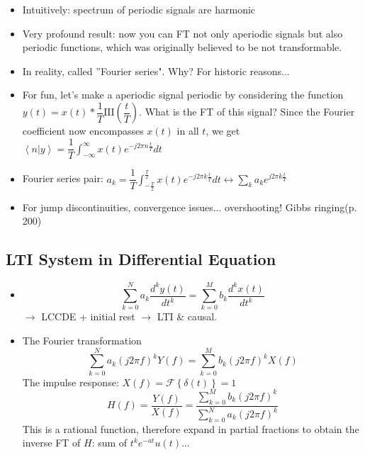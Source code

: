 \documentclass{article}
\begin{document}
\begin{itemize}
    \item Intuitively: spectrum of periodic signals are harmonic
    \item Very profound result: now you can FT not only aperiodic signals but also periodic functions, which was originally believed to be not transformable.
    \item In reality, called ''Fourier series". Why? For historic reasons...
    \item For fun, let's make a aperiodic signal periodic by considering the function $y(t)=x(t)*\dfrac{1}{T}\mathrm{III}\left(\dfrac{t}{T}\right)$. What is the FT of this signal? Since the Fourier coefficient now encompasses $x(t)$ in all $t$, we get $\left<n|y\right>=\dfrac{1}{T}\displaystyle\int_{-\infty}^{\infty}{x(t)e^{-j2\pi n\frac{t}{T}}}dt$
    \item Fourier series pair: $a_k=\dfrac{1}{T}\displaystyle\int_{-\frac{T}{2}}^{\frac{T}{2}}{x(t)e^{-j2\pi k\frac{t}{T}}}dt\leftrightarrow\displaystyle\sum_k{a_k e^{j2\pi k\frac{t}{T}}}$
    \item For jump discontinuities, convergence issues... overshooting! Gibbs ringing(p. 200)
\end{itemize}
\subsection{LTI System in Differential Equation}
\begin{itemize}
\item 
\[
\sum_{k=0}^{N}{a_k\frac{d^ky(t)}{dt^k}}=\sum_{k=0}^{M}{b_k\frac{d^kx(t)}{dt^k}}
\]
$\rightarrow$ LCCDE + initial rest $\rightarrow$ LTI \& causal.
\item The Fourier transformation
\[
\sum_{k=0}^{N}{a_k(j2\pi f)^kY(f)}=\sum_{k=0}^{M}{b_k(j2\pi f)^kX(f)}
\]
The impulse response: $X(f)=\mathcal{F}\left\{\delta(t)\right\}=1$
\[
H(f)=\frac{Y(f)}{X(f)}=\frac{\sum_{k=0}^{M}{b_k(j2\pi f)^k}}{\sum_{k=0}^{N}{a_k(j2\pi f)^k}}
\]
This is a rational function, therefore expand in partial fractions to obtain the inverse FT of $H$: sum of $t^ke^{-at}u(t)$...
\end{itemize}
\end{document}
